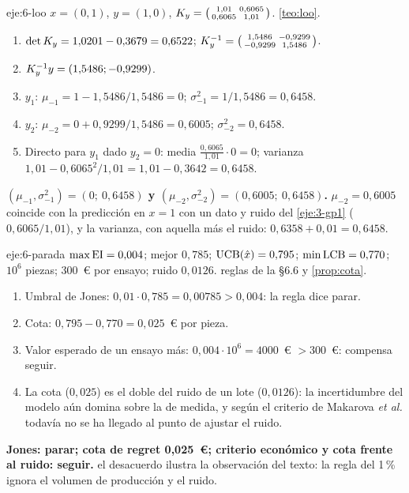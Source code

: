 \begin{solucion}{eje:6-loo}
\datos $x=(0,1)$, $y=(1,0)$, $K_{y}=\bigl(\begin{smallmatrix}1{,}01&0{,}6065\\0{,}6065&1{,}01\end{smallmatrix}\bigr)$.
\planteamiento \cref{teo:loo}.
\pasos
\begin{enumerate}[label=\arabic*.]
  \item $\det K_{y}=1{,}0201-0{,}3679=0{,}6522$; $K_{y}^{-1}=\bigl(\begin{smallmatrix}1{,}5486&-0{,}9299\\-0{,}9299&1{,}5486\end{smallmatrix}\bigr)$.
  \item $K_{y}^{-1}y=(1{,}5486;-0{,}9299)$.
  \item $y_1$: $\mu_{-1}=1-1{,}5486/1{,}5486=0$; $\sigma_{-1}^2=1/1{,}5486=0{,}6458$.
  \item $y_2$: $\mu_{-2}=0+0{,}9299/1{,}5486=0{,}6005$; $\sigma_{-2}^2=0{,}6458$.
  \item Directo para $y_1$ dado $y_2=0$: media $\frac{0{,}6065}{1{,}01}\cdot0=0$; varianza $1{,}01-0{,}6065^2/1{,}01=1{,}01-0{,}3642=0{,}6458$.
\end{enumerate}
\resultado \textbf{$(\mu_{-1},\sigma_{-1}^2)=(0;\ 0{,}6458)$ y $(\mu_{-2},\sigma_{-2}^2)=(0{,}6005;\ 0{,}6458)$.}
\comprobacion $\mu_{-2}=0{,}6005$ coincide con la predicción en $x=1$ con un dato y ruido del \cref{eje:3-gp1} ($0{,}6065/1{,}01$), y la varianza, con aquella más el ruido: $0{,}6358+0{,}01=0{,}6458$.
\end{solucion}

\begin{solucion}{eje:6-parada}
\datos $\max\operatorname{EI}=0{,}004$; mejor $0{,}785$; $\operatorname{UCB}(\hat x)=0{,}795$; $\min\operatorname{LCB}=0{,}770$; $10^6$ piezas; 300~€ por ensayo; ruido $0{,}0126$.
\planteamiento reglas de la §6.6 y \cref{prop:cota}.
\pasos
\begin{enumerate}[label=(\alph*)]
  \item Umbral de Jones: $0{,}01\cdot0{,}785=0{,}00785>0{,}004$: la regla dice parar.
  \item Cota: $0{,}795-0{,}770=0{,}025$~€ por pieza.
  \item Valor esperado de un ensayo más: $0{,}004\cdot10^6=4000$~€ $>300$~€: compensa seguir.
  \item La cota ($0{,}025$) es el doble del ruido de un lote ($0{,}0126$): la incertidumbre del modelo aún domina sobre la de medida, y según el criterio de Makarova \emph{et al.} todavía no se ha llegado al punto de ajustar el ruido.
\end{enumerate}
\resultado \textbf{Jones: parar; cota de regret 0,025~€; criterio económico y cota frente al ruido: seguir.}
\comprobacion el desacuerdo ilustra la observación del texto: la regla del 1\,\% ignora el volumen de producción y el ruido.
\end{solucion}


